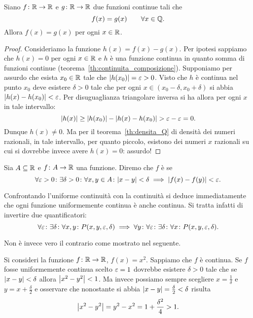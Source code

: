 \begin{lemma}
\label{lm:unicita_continua}%
Siano $f\colon \mathbb R\to\mathbb R$ e $g\colon \mathbb R\to\mathbb R$
due funzioni continue tali che
\[
  f(x) = g(x) \qquad \forall x\in \mathbb Q.
\]
Allora $f(x)=g(x)$ per ogni $x\in \mathbb R$.
\end{lemma}
%
\begin{proof}
Consideriamo la funzione $h(x)=f(x)-g(x)$.
Per ipotesi sappiamo che $h(x)=0$ per ogni $x\in \mathbb R$
e $h$ è una funzione continua in quanto somma di funzioni continue (teorema~\ref{th:continuita_composizione}).
Supponiamo per assurdo che esista $x_0\in \mathbb R$
tale che ${\left|h(x_0)\right|}= \varepsilon > 0$. Visto che $h$
è continua nel punto $x_0$ deve esistere $\delta>0$
tale che per ogni $x\in (x_0-\delta,x_0+\delta)$
si abbia ${\left|h(x)-h(x_0)\right|}<\varepsilon$.
Per disuguaglianza triangolare inversa
si ha allora per ogni $x$ in tale intervallo:
\[
  {\left|h(x)\right|} \ge {\left|h(x_0)\right|} - {\left|h(x)-h(x_0)\right|}
  > \varepsilon - \varepsilon = 0.
\]
Dunque $h(x)\neq 0$.
Ma per il teorema~\ref{th:densita_Q} di densità dei
numeri razionali, in tale intervallo, per quanto piccolo, esistono dei numeri $x$ razionali su cui si
dovrebbe invece avere $h(x)=0$: assurdo!
\end{proof}

\begin{definition}
Sia $A\subseteq \mathbb R$ e $f\colon A \to \mathbb R$ una funzione.
Diremo che $f$ è 
se
\begin{equation}\label{eq:346963}
 \forall \varepsilon>0\colon \exists \delta>0 \colon
 \forall x,y\in A\colon
 {\left|x-y\right|}<\delta \implies {\left|f(x)-f(y)\right|}<\varepsilon.
\end{equation}
\end{definition}

Confrontando l'uniforme continuità con la continuità
si deduce immediatamente che ogni funzione
uniformemente continua è anche continua.
Si tratta infatti di invertire due quantificatori:
\[
  \forall \varepsilon \colon \exists \delta \colon \forall x,y
  \colon P(x,y,\varepsilon,\delta)
  \implies \forall y \colon \forall \varepsilon \colon \exists \delta
  \colon\forall x\colon P(x,y,\varepsilon,\delta).
\]

Non è invece vero il contrario come mostrato nel seguente.

\begin{example}
Si consideri la funzione $f\colon \mathbb R\to\mathbb R$, $f(x)=x^2$.
Sappiamo che $f$ è continua. Se $f$ fosse uniformemente continua scelto $\varepsilon=1$ dovrebbe esistere $\delta>0$ tale
che se ${\left|x-y\right|}<\delta$ allora ${\left|x^2-y^2\right|}<1$.
Ma invece possiamo sempre scegliere $x=\frac 1 \delta$
e $y=x+\frac \delta 2$ e osservare che nonostante
si abbia ${\left|x-y\right|}=\frac \delta 2 < \delta$ risulta
\[
 {\left|x^2-y^2\right|} = y^2-x^2 = 1 + \frac{\delta^2}{4} > 1.
\]
\end{example}

